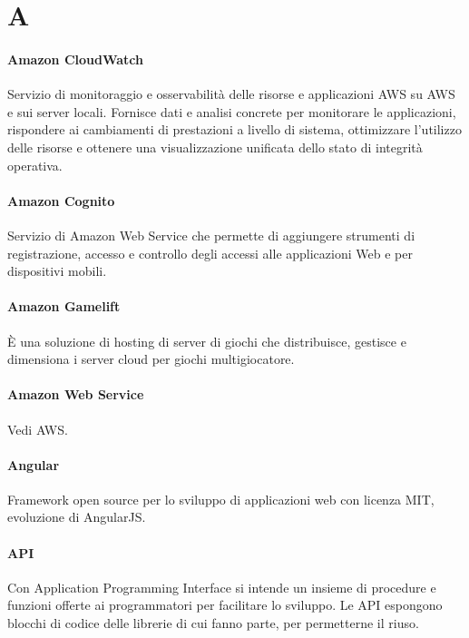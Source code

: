 \documentclass[]{article}
\begin{document}
	
	\newpage


	\section*{A}
	
	\paragraph*{Amazon CloudWatch}
	Servizio di monitoraggio e osservabilità delle risorse e applicazioni AWS su AWS e sui server locali. Fornisce dati e analisi concrete per monitorare le applicazioni, rispondere ai cambiamenti di prestazioni a livello di sistema, ottimizzare l'utilizzo delle risorse e ottenere una visualizzazione unificata dello stato di integrità operativa.
	
	\paragraph*{Amazon Cognito}
	Servizio di Amazon Web Service che permette di aggiungere strumenti di registrazione, accesso e controllo degli accessi alle applicazioni Web e per dispositivi mobili.
	
	\paragraph*{Amazon Gamelift}
	È una soluzione di hosting di server di giochi che distribuisce, gestisce e dimensiona i server cloud per giochi multigiocatore.
	
	\paragraph*{Amazon Web Service}
	Vedi AWS.
	
	\paragraph*{Angular}
	Framework open source per lo sviluppo di applicazioni web con licenza MIT, evoluzione di AngularJS.
	
	\paragraph*{API}
	Con Application Programming Interface si intende un insieme di procedure e funzioni offerte ai programmatori per facilitare lo sviluppo. Le API espongono blocchi di codice delle librerie di cui fanno parte, per permetterne il riuso.
	
\end{document}
